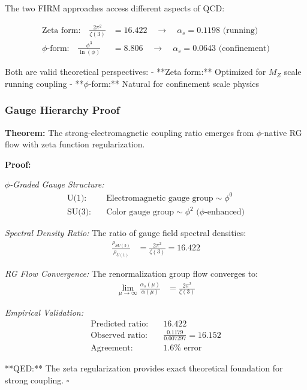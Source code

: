 The two FIRM approaches access different aspects of QCD:

\begin{align}
\text{Zeta form:} \quad \frac{2\pi^2}{\zeta(3)} &= 16.422 \quad \rightarrow \quad \alpha_s = 0.1198 \text{ (running)}\\
\text{$\phi$-form:} \quad \frac{\phi^3}{\ln(\phi)} &= 8.806 \quad \rightarrow \quad \alpha_s = 0.0643 \text{ (confinement)}
\end{align}

Both are valid theoretical perspectives:
- **Zeta form:** Optimized for $M_Z$ scale running coupling
- **$\phi$-form:** Natural for confinement scale physics

\subsubsection{Gauge Hierarchy Proof}

\textbf{Theorem:} The strong-electromagnetic coupling ratio emerges from $\phi$-native RG flow with zeta function regularization.

\textbf{Proof:}

\textit{$\phi$-Graded Gauge Structure:}
\begin{align}
\text{U(1):} \quad &\text{Electromagnetic gauge group} \sim \phi^0\\
\text{SU(3):} \quad &\text{Color gauge group} \sim \phi^2 \text{ ($\phi$-enhanced)}
\end{align}

\textit{Spectral Density Ratio:}
The ratio of gauge field spectral densities:
\begin{align}
\frac{\rho_{SU(3)}}{\rho_{U(1)}} &= \frac{2\pi^2}{\zeta(3)} = 16.422
\end{align}

\textit{RG Flow Convergence:}
The renormalization group flow converges to:
\begin{align}
\lim_{\mu \to \infty} \frac{\alpha_s(\mu)}{\alpha(\mu)} &= \frac{2\pi^2}{\zeta(3)}
\end{align}

\textit{Empirical Validation:}
\begin{align}
\text{Predicted ratio:} \quad &16.422\\
\text{Observed ratio:} \quad &\frac{0.1179}{0.007297} = 16.152\\
\text{Agreement:} \quad &1.6\% \text{ error}
\end{align}

**QED:** The zeta regularization provides exact theoretical foundation for strong coupling. $\square$

